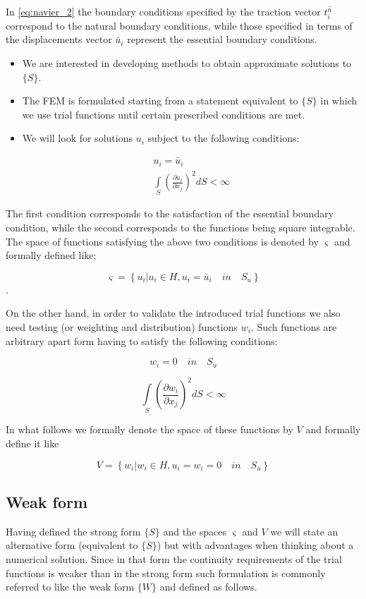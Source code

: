 In \cref{eq:navier_2} the boundary conditions specified by the traction vector $t_i^{\hat n}$ correspond to the natural boundary conditions, while those specified in terms of the displacements vector $\bar u_i$ represent the essential boundary conditions.

\begin{itemize}
\item We are interested in developing methods to obtain approximate solutions to $\{ S \}$.
\item The FEM is formulated starting from a statement equivalent to $\{ S \}$ in which we use trial functions until certain prescribed conditions are met.
\item We will look for solutions $u_i$ subject to the following conditions:

\begin{align*}
u_i=\bar u_i\\
\int\limits_S {{{\left( {\frac{{\partial {u_i}}}{{\partial {x_j}}}} \right)}^2}} dS < \infty
\end{align*}

\end{itemize}

The first condition corresponds to the satisfaction of the essential boundary condition, while the second corresponds to the functions being square integrable. The space of functions satisfying the above two conditions is denoted by $\varsigma$ and formally defined like;

\[ \varsigma = \left\{ {{u_i}\left| {{u_i} \in H,{u_i} = {{\bar u}_i} \quad in \quad {S_u}} \right.} \right\}\].

On the other hand, in order to validate the introduced trial functions we also need testing (or weighting and distribution) functions $w_i$. Such functions are arbitrary apart form having to satisfy the following conditions:

\[w_i=0 \quad in \quad {S_u}\]

\[\int\limits_S {{{\left( {\frac{{\partial {w_i}}}{{\partial {x_j}}}} \right)}^2}} dS < \infty \]

In what follows we formally denote the space of these functions by $V$ and formally define it like

\[ V = \left\{ {{w_i}\left| {{w_i} \in H,{u_i} = {w_i=0} \quad in \quad {S_u}} \right.} \right\}\]

\subsection*{Weak form}
Having defined the strong form $\{S\}$ and the spaces $\varsigma$ and $V$ we will state an alternative form (equivalent to $\{S\}$) but with advantages when thinking about a numerical solution. Since in that form the continuity requirements of the trial functions is weaker than in the strong form such formulation is commonly referred to like the weak form $\{W\}$ and defined as follows.

